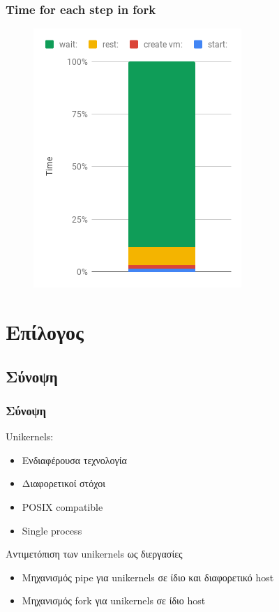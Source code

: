 \documentclass[red,slidestop,notes,compress,mathserif]{beamer}
\begin{document}
\begin{frame}
\frametitle{Time for each step in fork}
\begin{figure}
\center
\includegraphics[scale=0.6]{figures/fork_breakdown.png}
\end{figure}
\end{frame}

\section*{Επίλογος}

\subsection*{Σύνοψη}

\begin{frame}
\frametitle{Σύνοψη}
Unikernels:
\begin{itemize}
\item Ενδιαφέρουσα τεχνολογία
\item Διαφορετικοί στόχοι 
\item POSIX compatible
\item Single process
\end{itemize}
\begin{block}{Αντιμετόπιση των unikernels ως διεργασίες}
\begin{itemize}
\item Μηχανισμός pipe για unikernels σε ίδιο και διαφορετικό host
\item Μηχανισμός fork για unikernels σε ίδιο host
\end{itemize}
\end{block}
\end{frame}
\end{document}
